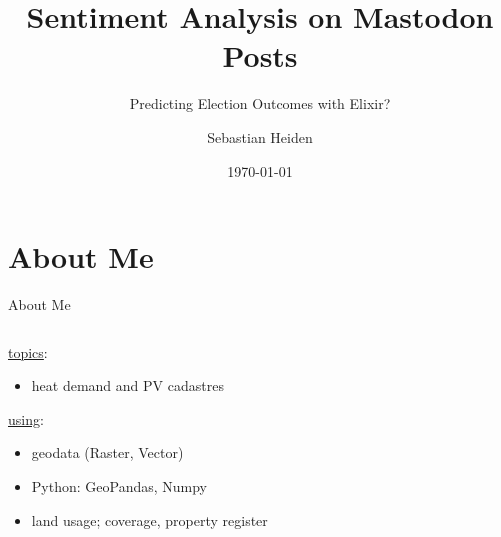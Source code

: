 \documentclass[usenames,dvipsnames,aspectratio=169]{beamer}
\title{Sentiment Analysis on Mastodon Posts}
\subtitle{Predicting Election Outcomes with Elixir?}
\author{Sebastian Heiden}
\institute{Harz University of Applied Sciences}
\date{\today}
\begin{document}
	
	{
		\begin{frame}
			\titlepage
		\end{frame}
	}
	
	
	\section{About Me}
	\begin{frame}{About Me}
		\begin{columns}
			
			\begin{column}{0.45\textwidth}
				\begin{tcolorbox}[colback=white, colframe=ElixirPurple, arc=3mm, boxrule=0mm, height=0.8\textheight, valign=center, title=Working Live]
					
					\underline{topics}:
					\begin{itemize}
						\item heat demand and PV cadastres
					\end{itemize}
					\underline{using}:
					\begin{itemize}
						\item geodata (Raster, Vector)
						\item Python: GeoPandas, Numpy
						\item land usage; coverage, property register
					\end{itemize}
		
				\end{tcolorbox}
			\end{column}
			

\end{columns}
\end{frame}
\end{document}
